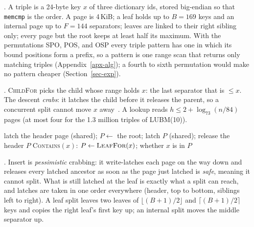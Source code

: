 .
A triple is a 24-byte key $x$ of three dictionary ids, stored big-endian so
that \texttt{memcmp} is the order.
A page is 4\,KiB; a leaf holds up to $B{=}169$ keys and an internal page up to
$F{=}144$ separators; leaves are linked to their right sibling only; every page
but the root keeps at least half its maximum.
With the permutations SPO, POS, and OSP every triple pattern has one in which
its bound positions form a prefix, so a pattern is one range scan that returns
only matching triples (Appendix~\ref{apx-alg}); a fourth to sixth permutation
would make no pattern cheaper (Section~\ref{sec-exp}).

.
\textsc{ChildFor} picks the child whose range holds $x$: the last separator
that is $\le x$.
The descent \emph{crabs}: it latches the child before it releases the parent,
so a concurrent split cannot move $x$ away~\cite{lehman1981,graefe2011}.
A lookup reads $h\le 2+\log_{73}(n/84)$ pages (at most four for the 1.3 million
triples of LUBM(10)).

\begin{algorithm}[t]
\caption{\textsc{LeafFor}$(x)$ and \textsc{Contains}$(x)$}\label{alg-search}
\small
latch the header page (shared); $P \gets$ the root; 
latch $P$ (shared); release the header\;
\Return $P$\;
\textsc{Contains}$(x)$: $P \gets \textsc{LeafFor}(x)$; \Return whether $x$ is in $P$\;
\end{algorithm}

.
Insert is \emph{pessimistic} crabbing: it write-latches each page on the way
down and releases every latched ancestor as soon as the page just latched is
\emph{safe}, meaning it cannot split.
What is still latched at the leaf is exactly what a split can reach, and
latches are taken in one order everywhere (header, top to bottom, siblings
left to right).
A leaf split leaves two leaves of $\lfloor (B{+}1)/2\rfloor$ and $\lceil
(B{+}1)/2\rceil$ keys and copies the right leaf's first key up; an internal
split moves the middle separator up.

